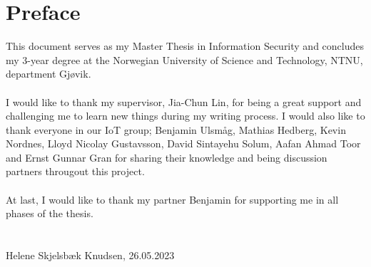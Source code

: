 \chapter*{Preface}

This document serves as my Master Thesis in Information Security and concludes my 3-year degree at the Norwegian University of Science and Technology, NTNU, department Gjøvik.
\\\\
I would like to thank my supervisor, Jia-Chun Lin, for being a great support and challenging me to learn new things during my writing process. I would also like to thank everyone in our IoT group; Benjamin Ulsmåg, Mathias Hedberg, Kevin Nordnes, Lloyd Nicolay Gustavsson, David Sintayehu Solum, Aafan Ahmad Toor and Ernst Gunnar Gran for sharing their knowledge and being discussion partners througout this project. 
\\\\
At last, I would like to thank my partner Benjamin for supporting me in all phases of the thesis. 
\\\\\\
Helene Skjelsbæk Knudsen, 26.05.2023